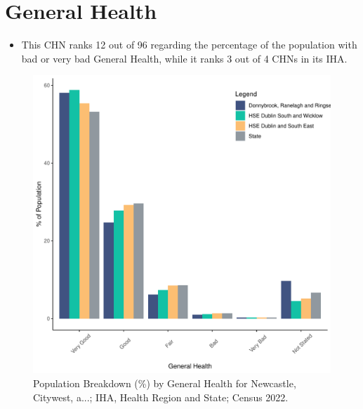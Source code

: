\documentclass{article}
\begin{document}
\pagebreak

\section{General Health}\label{sect:GenHealth}
\begin{itemize}
\item  This CHN ranks  12 out of 96 regarding the percentage of the population with bad or very bad General Health, while it ranks   3 out of 4 CHNs in its IHA.
\end{itemize}
\begin{figure}[h]
	\centering
	\includegraphics[width = 150mm]{../figures/GenED.pdf}
	\caption{Population Breakdown (\%) by General Health for Newcastle, Citywest, a...; IHA, Health Region and State;  Census 2022.}
	\label{fig:2ae19629-1a6a-13a3-e055-000000000001}
	\end{figure}
\end{document}
